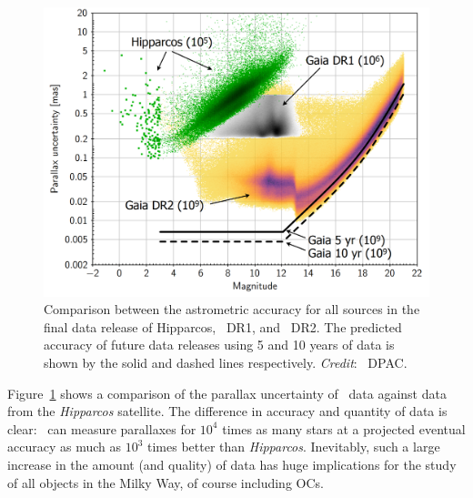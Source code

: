 \begin{figure}[tb]
	\includegraphics[width=\textwidth]{fig/c1/gaia_dr2_astrometry.png}
	\caption[Comparison between the astrometric accuracy for Hipparcos, Gaia, and future Gaia data releases]{Comparison between the astrometric accuracy for all sources in the final data release of Hipparcos, \gaia\ DR1, and \gaia\ DR2. The predicted accuracy of future data releases using 5 and 10 years of data is shown by the solid and dashed lines respectively. \emph{Credit}: \gaia\ DPAC.}
	\label{fig:intro:history:gaia_accuracy}
\end{figure}

Figure~\ref{fig:intro:history:gaia_accuracy} shows a comparison of the parallax uncertainty of \gaia\ data against data from the \emph{Hipparcos} satellite. The difference in accuracy and quantity of data is clear: \gaia\ can measure parallaxes for $10^4$ times as many stars at a projected eventual accuracy as much as $10^3$ times better than \emph{Hipparcos}. Inevitably, such a large increase in the amount (and quality) of data has huge implications for the study of all objects in the Milky Way, of course including OCs.

